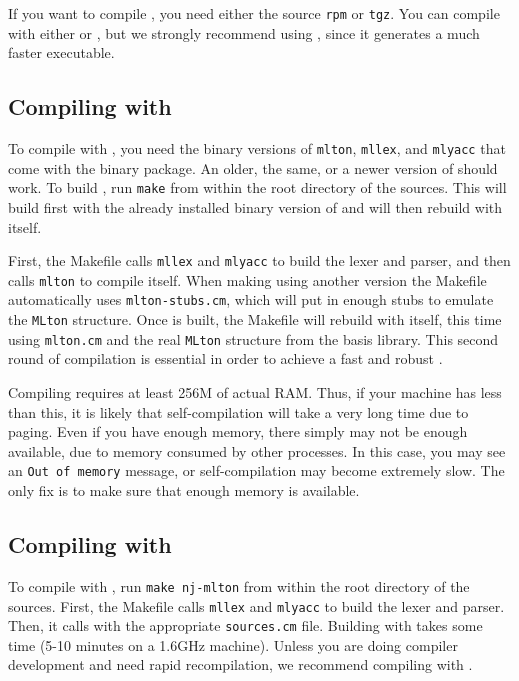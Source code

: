 
If you want to compile {\mlton}, you need either the source {\tt rpm}
or {\tt tgz}.  You can compile with either {\mlton} or {\smlnj}, but
we strongly recommend using {\mlton}, since it generates a much faster
executable.

\subsection{Compiling with {\mlton}}

To compile with {\mlton}, you need the binary versions of {\tt mlton},
{\tt mllex}, and {\tt mlyacc} that come with the {\mlton} binary
package.  An older, the same, or a newer version of {\mlton} should
work.  To build {\mlton}, run {\tt make} from within the root
directory of the sources.  This will build {\mlton} first with the
already installed binary version of {\mlton} and will then rebuild
{\mlton} with itself.

First, the Makefile calls {\tt mllex} and {\tt mlyacc} to build the
lexer and parser, and then calls {\tt mlton} to compile itself.  When
making {\mlton} using another version the Makefile automatically uses
{\tt mlton-stubs.cm}, which will put in enough stubs to emulate the
{\tt MLton} structure.  Once {\mlton} is built, the Makefile will
rebuild {\mlton} with itself, this time using {\tt mlton.cm} and the
real {\tt MLton} structure from the basis library.  This second round
of compilation is essential in order to achieve a fast and robust
{\mlton}.

Compiling {\mlton} requires at least 256M of actual RAM.  Thus, if
your machine has less than this, it is likely that self-compilation
will take a very long time due to paging.  Even if you have enough
memory, there simply may not be enough available, due to memory
consumed by other processes.  In this case, you may see an {\tt Out of
memory} message, or self-compilation may become extremely slow.  The
only fix is to make sure that enough memory is available.

\subsection{Compiling with {\smlnj}}

To compile with {\smlnj}, run {\tt make nj-mlton} from within the root
directory of the sources.  First, the Makefile calls {\tt mllex} and
{\tt mlyacc} to build the lexer and parser.  Then, it calls {\smlnj}
with the appropriate {\tt sources.cm} file.  Building with {\smlnj}
takes some time (5-10 minutes on a 1.6GHz machine).  Unless you are
doing compiler development and need rapid recompilation, we recommend
compiling with {\mlton}.
